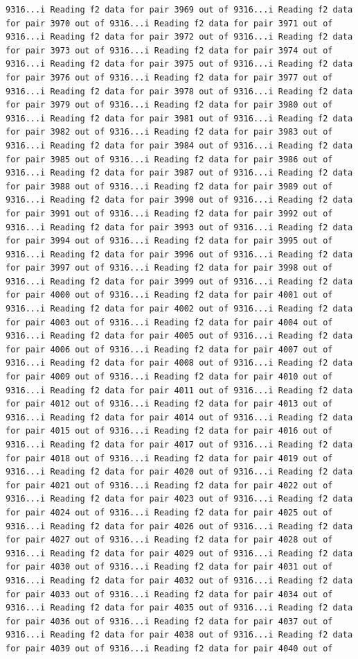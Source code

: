 \documentclass[
]{article}
\begin{document}
\begin{verbatim}
9316...i Reading f2 data for pair 3969 out of 9316...i Reading f2 data for pair 3970 out of 9316...i Reading f2 data for pair 3971 out of 9316...i Reading f2 data for pair 3972 out of 9316...i Reading f2 data for pair 3973 out of 9316...i Reading f2 data for pair 3974 out of 9316...i Reading f2 data for pair 3975 out of 9316...i Reading f2 data for pair 3976 out of 9316...i Reading f2 data for pair 3977 out of 9316...i Reading f2 data for pair 3978 out of 9316...i Reading f2 data for pair 3979 out of 9316...i Reading f2 data for pair 3980 out of 9316...i Reading f2 data for pair 3981 out of 9316...i Reading f2 data for pair 3982 out of 9316...i Reading f2 data for pair 3983 out of 9316...i Reading f2 data for pair 3984 out of 9316...i Reading f2 data for pair 3985 out of 9316...i Reading f2 data for pair 3986 out of 9316...i Reading f2 data for pair 3987 out of 9316...i Reading f2 data for pair 3988 out of 9316...i Reading f2 data for pair 3989 out of 9316...i Reading f2 data for pair 3990 out of 9316...i Reading f2 data for pair 3991 out of 9316...i Reading f2 data for pair 3992 out of 9316...i Reading f2 data for pair 3993 out of 9316...i Reading f2 data for pair 3994 out of 9316...i Reading f2 data for pair 3995 out of 9316...i Reading f2 data for pair 3996 out of 9316...i Reading f2 data for pair 3997 out of 9316...i Reading f2 data for pair 3998 out of 9316...i Reading f2 data for pair 3999 out of 9316...i Reading f2 data for pair 4000 out of 9316...i Reading f2 data for pair 4001 out of 9316...i Reading f2 data for pair 4002 out of 9316...i Reading f2 data for pair 4003 out of 9316...i Reading f2 data for pair 4004 out of 9316...i Reading f2 data for pair 4005 out of 9316...i Reading f2 data for pair 4006 out of 9316...i Reading f2 data for pair 4007 out of 9316...i Reading f2 data for pair 4008 out of 9316...i Reading f2 data for pair 4009 out of 9316...i Reading f2 data for pair 4010 out of 9316...i Reading f2 data for pair 4011 out of 9316...i Reading f2 data for pair 4012 out of 9316...i Reading f2 data for pair 4013 out of 9316...i Reading f2 data for pair 4014 out of 9316...i Reading f2 data for pair 4015 out of 9316...i Reading f2 data for pair 4016 out of 9316...i Reading f2 data for pair 4017 out of 9316...i Reading f2 data for pair 4018 out of 9316...i Reading f2 data for pair 4019 out of 9316...i Reading f2 data for pair 4020 out of 9316...i Reading f2 data for pair 4021 out of 9316...i Reading f2 data for pair 4022 out of 9316...i Reading f2 data for pair 4023 out of 9316...i Reading f2 data for pair 4024 out of 9316...i Reading f2 data for pair 4025 out of 9316...i Reading f2 data for pair 4026 out of 9316...i Reading f2 data for pair 4027 out of 9316...i Reading f2 data for pair 4028 out of 9316...i Reading f2 data for pair 4029 out of 9316...i Reading f2 data for pair 4030 out of 9316...i Reading f2 data for pair 4031 out of 9316...i Reading f2 data for pair 4032 out of 9316...i Reading f2 data for pair 4033 out of 9316...i Reading f2 data for pair 4034 out of 9316...i Reading f2 data for pair 4035 out of 9316...i Reading f2 data for pair 4036 out of 9316...i Reading f2 data for pair 4037 out of 9316...i Reading f2 data for pair 4038 out of 9316...i Reading f2 data for pair 4039 out of 9316...i Reading f2 data for pair 4040 out of 
\end{verbatim}
\end{document}
